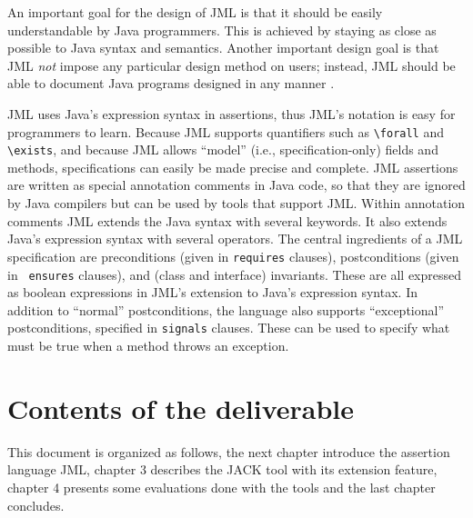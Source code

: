 An important goal for the design of JML is that it should be easily
understandable by Java programmers. This is achieved by staying as
close as possible to Java syntax and semantics.  Another important
design goal is that JML {\em not} impose any particular design method
on users; instead, JML should be able to document Java programs
designed in any manner \cite{Leavens-Baker-Ruby03}.

JML uses Java's expression syntax in assertions,
thus JML's notation is easy for programmers to learn.  
Because JML supports quantifiers such as
\verb_\forall_ and \verb_\exists_, and because JML allows ``model''
(i.e., specification-only) fields and methods, specifications can
easily be made precise and complete.
JML assertions are written as special
annotation comments in Java code,
so that they are ignored by Java compilers but can be used
by tools that support JML\@.  Within annotation comments JML extends the
Java syntax with several keywords.  It also extends Java's expression syntax with several
operators.
The central ingredients of a JML specification are preconditions
(given in {\tt requires} clauses), postconditions (given in {\tt
  ensures} clauses), and (class and interface) invariants.  These are
all expressed as boolean expressions in JML's extension to Java's
expression syntax.
In addition to ``normal'' postconditions, the language also supports
``exceptional'' postconditions, specified in {\tt signals} clauses.
These can be used to specify what must be true when a method throws an
exception. 


\section{Contents of the deliverable}
This document is organized as follows, the next chapter introduce the
assertion language JML, chapter 3 describes the JACK tool with its
extension feature, chapter 4 presents some evaluations done with the
tools and the last chapter concludes.
